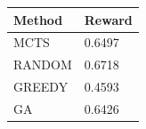 \begin{tabular}{ll}
\hline
Method & Reward \\
\hline
  MCTS & 0.6497 \\
  RANDOM & 0.6718 \\
  GREEDY & 0.4593 \\
  GA & 0.6426 \\
\hline
\end{tabular}

